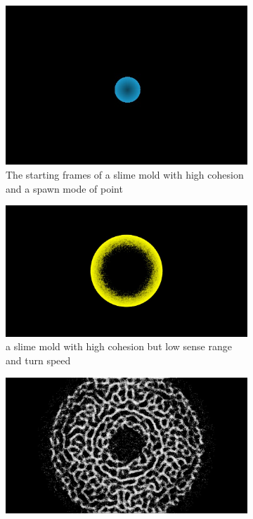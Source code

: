 \documentclass[]{report}
\begin{document}
\begin{figure}
    \centering
    \begin{subfigure}{0.3\textwidth}
        \includegraphics[width=0.9\linewidth]{images/EPQ 1.jpg}
        \caption{The starting frames of a slime mold with high cohesion and a spawn mode of point}
        \label{fig:EPQ_1}
    \end{subfigure}
    \hfill
    \begin{subfigure}{0.3\textwidth}
        \includegraphics[width=0.9\linewidth]{images/EPQ 2.jpg}
        \caption{a slime mold with high cohesion but low sense range and turn speed}
        \label{fig:EPQ_2}
    \end{subfigure}
    \hfill
    \begin{subfigure}{0.3\textwidth}
        \includegraphics[width=0.9\linewidth]{images/EPQ 3.jpg}

\end{subfigure}
\end{figure}
\end{document}

